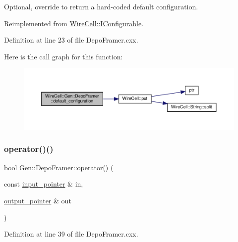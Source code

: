 Optional, override to return a hard-\/coded default configuration. 



Reimplemented from \hyperlink{class_wire_cell_1_1_i_configurable_a54841b2da3d1ea02189478bff96f7998}{Wire\+Cell\+::\+I\+Configurable}.



Definition at line 23 of file Depo\+Framer.\+cxx.

Here is the call graph for this function\+:
\nopagebreak
\begin{figure}[H]
\begin{center}
\leavevmode
\includegraphics[width=350pt]{class_wire_cell_1_1_gen_1_1_depo_framer_adee1889f1ab532a31f8ae66e149ee8a4_cgraph}
\end{center}
\end{figure}
\mbox{\label{class_wire_cell_1_1_gen_1_1_depo_framer_a6ad456e0ccd9361b047b5f3f8b89fbd6}} 
\subsubsection{\texorpdfstring{operator()()}{operator()()}}
{\footnotesize\ttfamily bool Gen\+::\+Depo\+Framer\+::operator() (\begin{DoxyParamCaption}\item[{const \hyperlink{class_wire_cell_1_1_i_function_node_a55c0946156df9b712b8ad1a0b59b2db6}{input\+\_\+pointer} \&}]{in,  }\item[{\hyperlink{class_wire_cell_1_1_i_function_node_afc02f1ec60d31aacddf64963f9ca650b}{output\+\_\+pointer} \&}]{out }\end{DoxyParamCaption})\hspace{0.3cm}{\ttfamily [virtual]}}



Definition at line 39 of file Depo\+Framer.\+cxx.

